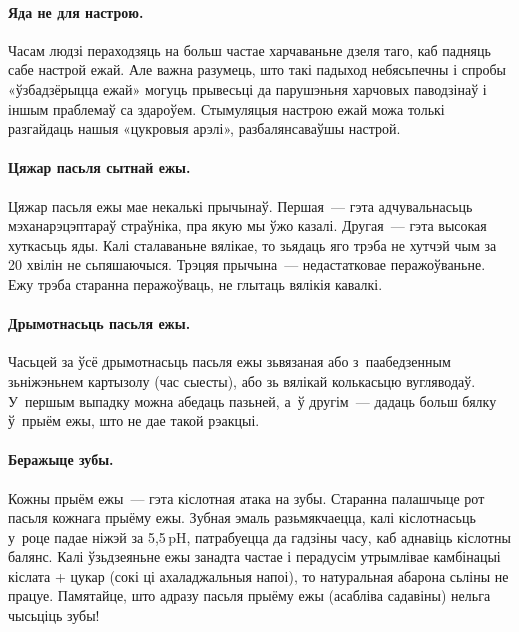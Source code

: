
\paragraph{Яда не для настрою.}
Часам людзі пераходзяць на больш частае харчаваньне дзеля таго, каб падняць сабе настрой ежай. Але важна разумець, што такі падыход небясьпечны і спробы «ўзбадзёрыцца ежай» могуць прывесьці да парушэньня харчовых паводзінаў і іншым праблемаў са здароўем. Стымуляцыя настрою ежай можа толькі разгайдаць нашыя «цукровыя арэлі», разбалянсаваўшы настрой.

\paragraph{Цяжар пасьля сытнай ежы.}
Цяжар пасьля ежы мае некалькі прычынаў. Першая~--- гэта адчувальнасьць мэханарэцэптараў страўніка, пра якую мы ўжо казалі. Другая~--- гэта высокая хуткасьць яды. Калі сталаваньне вялікае, то зьядаць яго трэба не хутчэй чым за 20 хвілін не сьпяшаючыся. Трэцяя прычына~--- недастатковае перажоўваньне. Ежу трэба старанна перажоўваць, не глытаць вялікія кавалкі.

\paragraph{Дрымотнасьць пасьля ежы.}
Часьцей за ўсё дрымотнасьць пасьля ежы зьвязаная або з~паабедзенным зьніжэньнем картызолу (час сыесты), або зь вялікай колькасьцю вугляводаў. У~першым выпадку можна абедаць пазьней, а~ў другім~--- дадаць больш бялку ў~прыём ежы, што не дае такой рэакцыі.

\paragraph{Беражыце зубы.}
Кожны прыём ежы~--- гэта кіслотная атака на зубы. Старанна палашчыце рот пасьля кожнага прыёму ежы. Зубная эмаль разьмякчаецца, калі кіслотнасьць у~роце падае ніжэй за 5{,}5\,pH, патрабуецца да гадзіны часу, каб аднавіць кіслотны балянс. Калі ўзьдзеяньне ежы занадта частае і перадусім утрымлівае камбінацыі кіслата + цукар (сокі ці ахаладжальныя напоі), то натуральная абарона сьліны не працуе. Памятайце, што адразу пасьля прыёму ежы (асабліва садавіны) нельга чысьціць зубы!

